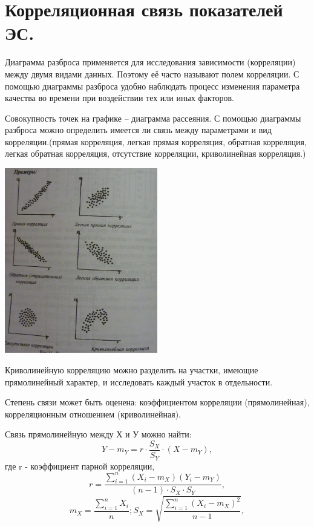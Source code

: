 \documentclass[unicode, 12pt, a4paper, oneside]{article}
\begin{document}
\section{Корреляционная связь показателей ЭС.}

Диаграмма разброса применяется для исследования зависимости (корреляции) между двумя видами данных. Поэтому её часто называют полем корреляции.
С помощью диаграммы разброса удобно наблюдать процесс изменения параметра качества во времени при воздействии тех или иных факторов.

Совокупность точек на графике – диаграмма рассеяния.
С помощью диаграммы разброса можно определить имеется ли связь между параметрами и вид корреляции.(прямая корреляция, легкая прямая корреляция, обратная корреляция, легкая обратная корреляция, отсутствие корреляции, криволинейная корреляция.)

 \begin{center} 
 \includegraphics[width=0.5\textwidth]{34_Korelyacia.png}
 \end{center}
 
 Криволинейную корреляцию можно разделить на участки, имеющие прямолинейный характер, и исследовать каждый участок в отдельности.
 
 Степень связи может быть оценена: коэффициентом корреляции (прямолинейная), корреляционным отношением (криволинейная).
 
 Связь прямолинейную между Х и У можно найти:
 \begin{equation}
 Y-m_Y = r \cdot \frac{S_X}{S_Y} \cdot (X-m_Y),
 \end{equation}
 где r - коэффициент парной корреляции,
 \begin{equation}
 r = \frac{\sum_{i=1}^n (X_i - m_X)(Y_i-m_Y)}{(n-1) \cdot S_X \cdot S_Y},
 \end{equation} 
 \begin{equation}
 m_X = \dfrac{\sum_{i=1}^n X_i}{n}; S_X=\sqrt{\dfrac{\sum_{i=1}^n (X_i -m_X)^2}{n-1}},
 \end{equation}
 
\end{document}
